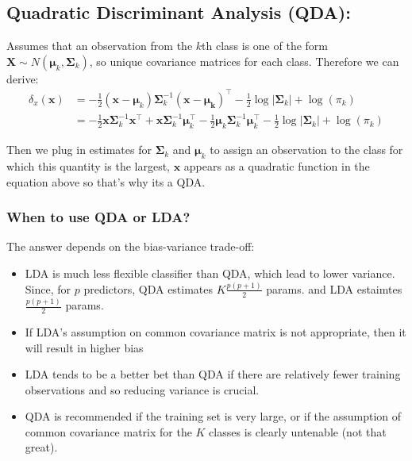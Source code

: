 \documentclass[11pt]{article}
\begin{document}
\subsection{Quadratic Discriminant Analysis (QDA):}
Assumes that an observation from the $k$th class is one of the form $\boldsymbol{X} \sim N(\boldsymbol{\mu}_k, \boldsymbol{\Sigma}_k)$, so unique covariance matrices for each class. Therefore we can derive:
\begin{align*}
    \delta_{x}(\boldsymbol{x}) &= -\frac{1}{2}(\boldsymbol{x} - \boldsymbol{\mu}_k)\boldsymbol{\Sigma}_{k}^{-1}(\boldsymbol{x - \boldsymbol{\mu}_k})^\top - \frac{1}{2}\log|\boldsymbol{\Sigma}_k| + \log(\pi_k) \\
    &= -\frac{1}{2}\boldsymbol{x}\boldsymbol{\Sigma}_k^{-1}\boldsymbol{x}^\top + \boldsymbol{x}\boldsymbol{\Sigma}_{k}^{-1}\boldsymbol{\mu}_{k}^{\top} - \frac{1}{2}\boldsymbol{\mu}_k\boldsymbol{\Sigma}_k^{-1}\boldsymbol{\mu}_k^{\top} - \frac{1}{2}\log|\boldsymbol{\Sigma}_k| + \log(\pi_k)
\end{align*}

\noindent Then we plug in estimates for $\boldsymbol{\Sigma}_k$ and $\boldsymbol{\mu}_k$ to assign an observation to the class for which this quantity is the largest, $\boldsymbol{x}$ appears as a quadratic function in the equation above so that's why its a QDA.

\subsubsection{When to use QDA or LDA?}
\noindent The answer depends on the bias-variance trade-off:
\begin{itemize}
    \item LDA is much less flexible classifier than QDA, which lead to lower variance. Since, for $p$ predictors, QDA estimates $K\frac{p(p+1)}{2}$ params. and LDA estaimtes $\frac{p(p+1)}{2}$ params.
    \item If LDA's assumption on common covariance matrix is not appropriate, then it will result in higher bias
    \item LDA tends to be a better bet than QDA if there are relatively fewer training observations and so reducing variance is crucial.
    \item QDA is recommended if the training set is very large, or if the assumption of common covariance matrix for the $K$ classes is clearly untenable (not that great).
\end{itemize}
\end{document}
